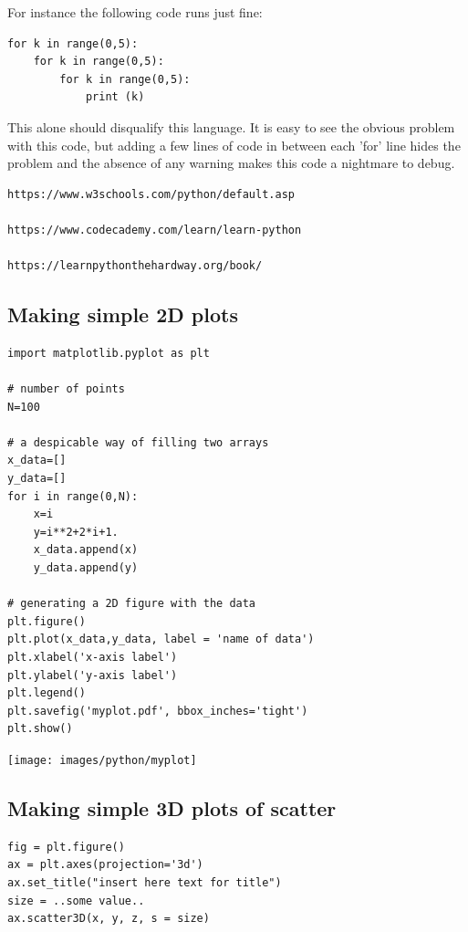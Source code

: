 For instance the following code runs just fine:

\begin{lstlisting}
for k in range(0,5): 
    for k in range(0,5):
        for k in range(0,5):
            print (k)
\end{lstlisting}

This alone should disqualify this language. It is easy to see the obvious problem with this code, but adding a few lines of code in between each 'for' line hides the problem and the absence of any warning makes this code a nightmare to debug.



\begin{verbatim}
https://www.w3schools.com/python/default.asp

https://www.codecademy.com/learn/learn-python

https://learnpythonthehardway.org/book/
\end{verbatim}

\subsection{Making simple 2D plots}

\begin{lstlisting}
import matplotlib.pyplot as plt

# number of points
N=100

# a despicable way of filling two arrays
x_data=[]
y_data=[]
for i in range(0,N):
    x=i
    y=i**2+2*i+1.
    x_data.append(x)
    y_data.append(y)

# generating a 2D figure with the data
plt.figure()
plt.plot(x_data,y_data, label = 'name of data')
plt.xlabel('x-axis label')
plt.ylabel('y-axis label')
plt.legend()
plt.savefig('myplot.pdf', bbox_inches='tight')
plt.show()
\end{lstlisting}

\begin{center}
\texttt{[image: images/python/myplot]}
\end{center}



\subsection{Making simple 3D plots of scatter}

\begin{lstlisting}
fig = plt.figure()
ax = plt.axes(projection='3d')
ax.set_title("insert here text for title")
size = ..some value..
ax.scatter3D(x, y, z, s = size)
\end{lstlisting}




